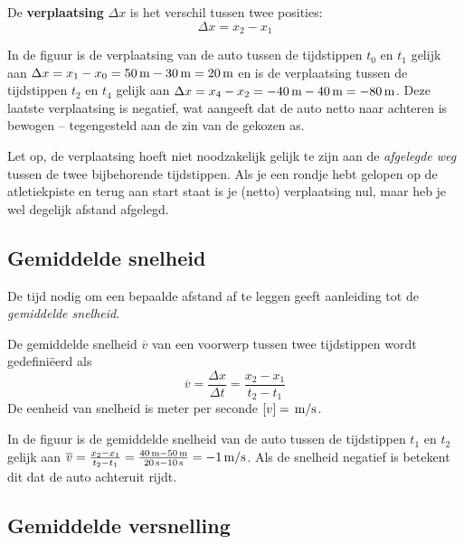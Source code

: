 \documentclass{ximera}
\begin{document}
	\begin{definition}
	De \textbf{verplaatsing} \(\Delta x\) is het verschil tussen twee posities:
	\[
		\Delta x = x_2-x_1
	\]
	\end{definition}

	In de figuur is de verplaatsing van de auto tussen de tijdstippen $t_0$ en $t_1$ gelijk aan $\Delta x = x_1-x_0=50\rm\,m-30\rm\,m=20\rm\,m$ en is de verplaatsing tussen de tijdstippen $t_2$ en $t_4$ gelijk aan $\Delta x=x_4-x_2=-40\rm\,m-40\rm\,m=-80\rm\,m$. Deze laatste verplaatsing is negatief, wat aangeeft dat de auto netto naar achteren is bewogen -- tegengesteld aan de zin van de gekozen as.

Let op, de verplaatsing hoeft niet noodzakelijk gelijk te zijn aan de \emph{afgelegde weg} tussen de twee bijbehorende tijdstippen. Als je een rondje hebt gelopen op de atletiekpiste en terug aan start staat is je (netto) verplaatsing nul, maar heb je wel degelijk afstand afgelegd.

\subsection*{Gemiddelde snelheid}


De tijd nodig om een bepaalde afstand af te leggen geeft aanleiding tot de \textit{gemiddelde snelheid}. 


\begin{definition}
	
De gemiddelde snelheid $\overline{v}$ van een voorwerp tussen twee tijdstippen wordt gedefiniëerd als
\[
\overline{v}=\frac{\Delta x}{\Delta t}=\frac{x_2-x_1}{t_2-t_1}
\]
De eenheid van snelheid is meter per seconde $[v]=\rm\,m/s$. 
\end{definition}

In de figuur is de gemiddelde snelheid van de auto tussen de tijdstippen $t_1$ en $t_2$ gelijk aan $\overline{v}=\frac{x_2-x_1}{t_2-t_1}=\frac{40\rm\,m-50\rm\,m}{20\rm\,s-10\rm\,s}=-1\rm\,m/s$. Als de snelheid negatief is betekent dit dat de auto achteruit rijdt.



\subsection*{Gemiddelde versnelling}
\end{document}
